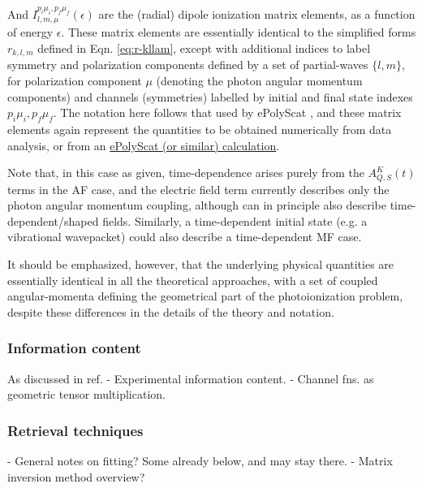 And \(I_{l,m,\mu}^{p_{i}\mu_{i},p_{f}\mu_{f}}(\epsilon)\) are the (radial) dipole ionization matrix elements, as a function of energy \(\epsilon\). These matrix elements are essentially identical to the simplified forms $r_{k,l,m}$ defined in Eqn. \ref{eq:r-kllam}, except with additional indices to label symmetry and polarization components
defined by a set of partial-waves \(\{l,m\}\), for polarization component \(\mu\) (denoting the photon angular momentum components) and channels (symmetries) labelled by initial and final state indexes \({p_{i}\mu_{i},p_{f}\mu_{f}}\). The notation here follows that used by ePolyScat \cite{Gianturco1994, Lucchese1986, Natalense1999}, and these matrix elements again represent the quantities  to be obtained numerically from data analysis, or from an \href{https://epsproc.readthedocs.io/en/latest/ePS_ePSproc_tutorial/ePS_tutorial_080520.html\#Theoretical-background}{ePolyScat (or similar) calculation}. 

Note that, in this case as given, time-dependence arises purely from the \(A_{Q,S}^{K}(t)\) terms in the AF case, and the electric field term currently describes only the photon angular momentum coupling,
although can in principle also describe time-dependent/shaped fields. Similarly, a time-dependent initial state (e.g. a vibrational wavepacket) could also describe a time-dependent MF case.

It should be emphasized, however, that the underlying physical quantities are essentially identical in all the theoretical approaches, with a set of coupled angular-momenta defining the geometrical part of the photoionization problem, despite these differences in the details of the theory and notation. 




\subsubsection{Information content}










As discussed in ref. \cite{hockett2018QMP2}
- Experimental information content.
- Channel fns. as geometric tensor multiplication.


\subsubsection{Retrieval techniques}

- General notes on fitting? Some already below, and may stay there.
- Matrix inversion method overview?
